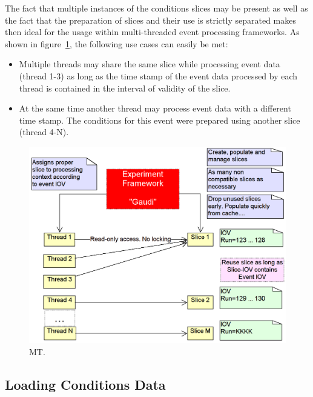 \documentclass[10pt,a4paper]{article}
\begin{document}
\noindent
The fact that multiple instances of the conditions slices may be present 
as well as the fact that the preparation of slices and their use is strictly
separated makes then ideal for the usage within multi-threaded event 
processing frameworks. As shown in 
figure~\ref{fig:ddcond-multi-threaded-processing}, 
the following use cases can easily be met:
\begin{itemize}
\item Multiple threads may share the same slice while processing event data
      (thread 1-3) as long as the time stamp of the event data processed 
      by each thread is contained in the interval of validity of the
      slice.
\item At the same time another thread may process event data with a different
      time stamp. The conditions for this event were prepared using another slice
      (thread 4-N).
\end{itemize}

\begin{figure}[t]
  \begin{center}\includegraphics[width=15cm] {DDCond-ConditionsMT}
    \caption{MT.}
    \label{fig:ddcond-multi-threaded-processing}
  \end{center}
\end{figure}
\vspace{-0.5cm}


\subsection{Loading Conditions Data}
\label{subsec:ddcond-data-loading}
\end{document}
